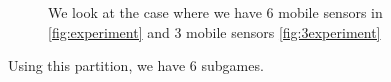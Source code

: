 \begin{figure}
\caption{We look at the case where we have 6 mobile sensors in \ref{fig:experiment} and 3 mobile sensors \ref{fig:3experiment}\label{fig:bigexp}}
\end{figure} 

Using this partition, we have 6 subgames. 